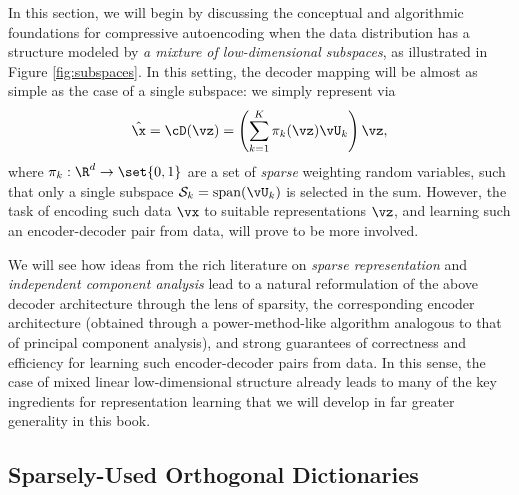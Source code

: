 \documentclass[../../book-main.tex]{subfiles}
\begin{document}
In this section, we will begin by discussing the conceptual and algorithmic foundations for compressive autoencoding when the data distribution has a structure modeled by {\em a mixture of low-dimensional subspaces}, as illustrated in Figure \ref{fig:subspaces}. In this setting, the decoder mapping will be almost as simple as the case of a single subspace: we simply represent via
\begin{equation}\label{eq:mixture-subspaces-decoder-first-cut}
    \hat{\x} = \cD(\vz) = \left( \sum_{k=1}^K \pi_k(\vz)\vU_k \right) \vz,
\end{equation}
where $\pi_k : \R^d \to \set{0,1}$ are a set of \textit{sparse} weighting random variables, such that only a single subspace $\mathcal{S}_k = \mbox{span}(\vU_k) $ is selected in the sum.
However, the task of encoding such data $\vx$ to suitable representations $\vz$, and learning such an encoder-decoder pair from data, will prove to be more involved.

We will see how ideas from the rich literature on \textit{sparse representation} and \textit{independent component analysis} lead to a natural reformulation of the above decoder architecture through the lens of sparsity, the corresponding encoder architecture (obtained through a power-method-like algorithm analogous to that of principal component analysis), and strong guarantees of correctness and efficiency for learning such encoder-decoder pairs from data. In this sense, the case of mixed linear low-dimensional structure already leads to many of the key ingredients for representation learning that we will develop in far greater generality in this book.


\subsection{Sparsely-Used Orthogonal Dictionaries}

\end{document}
